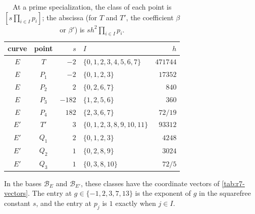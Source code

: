 \documentclass[12pt,oneside,openany]{book}
\theoremstyle{definition}
\theoremstyle{plain}
\numberwithin{equation}{chapter}
\theoremstyle{plain}
\theoremstyle{definition}
\theoremstyle{remark}
\newcommand{\sq}[1]{[#1]}
\newcommand{\cB}{\mathcal B}
\begin{document}
\begin{table}[htbp]
\centering
\caption{At a prime specialization, the class of each point is
$\sq{s\prod_{i\in I}p_i}$; the abscissa (for $T$ and $T'$, the coefficient $\beta$ or $\beta'$) is $sh^2\prod_{i\in I}p_i$.}
\label{tab:r7-classes}
\begin{tabular}{ccrlr}
\toprule
curve & point & $s$ & $I$ & $h$\\
\midrule
$E$ & $T$ & $-2$ & $\{0,1,2,3,4,5,6,7\}$ & $471744$\\
$E$ & $P_1$ & $-2$ & $\{0,1,2,3\}$ & $17352$\\
$E$ & $P_2$ & $2$ & $\{0,2,6,7\}$ & $840$\\
$E$ & $P_3$ & $-182$ & $\{1,2,5,6\}$ & $360$\\
$E$ & $P_4$ & $182$ & $\{2,3,6,7\}$ & $72/19$\\
\addlinespace
$E'$ & $T'$ & $3$ & $\{0,1,2,3,8,9,10,11\}$ & $93312$\\
$E'$ & $Q_1$ & $2$ & $\{0,1,2,3\}$ & $4248$\\
$E'$ & $Q_2$ & $1$ & $\{0,2,8,9\}$ & $3024$\\
$E'$ & $Q_3$ & $1$ & $\{0,3,8,10\}$ & $72/5$\\
\bottomrule
\end{tabular}
\end{table}

In the bases $\cB_E$ and $\cB_{E'}$, these classes have the coordinate
vectors of \cref{tab:r7-vectors}. The entry at $g\in\{-1,2,3,7,13\}$ is the
exponent of $g$ in the squarefree constant $s$, and the entry at $p_j$
is $1$ exactly when $j\in I$.
\end{document}
